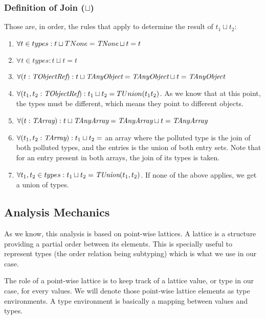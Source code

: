 \documentclass[a4paper]{article}
\begin{document}
\subsubsection{Definition of Join ($\sqcup$)}
Those are, in order, the rules that apply to determine the result of $t_1 \sqcup t_2$:
\begin{enumerate}
  \item $\forall t \in types : t \sqcup TNone = \emph{TNone} \sqcup t = t$
  \item $\forall t \in types : t \sqcup t = t$
  \item $\forall (t: \emph{TObjectRef}): t \sqcup \emph{TAnyObject} = \emph{TAnyObject} \sqcup t = \emph{TAnyObject}$
  \item $\forall (t_1,t_2: \emph{TObjectRef}): t_1 \sqcup t_2 = TUnion(t_1 t_2)$. As we
    know that at this point, the types must be different, which means they
    point to different objects.
  \item $\forall (t: \emph{TArray}): t \sqcup \emph{TAnyArray} = \emph{TAnyArray} \sqcup t = \emph{TAnyArray}$
  \item $\forall (t_1,t_2: \emph{TArray}): t_1 \sqcup t_2 = $ an array where the
    polluted type is the join of both polluted types, and the entries is the
    union of both entry sets. Note that for an entry present in both arrays,
    the join of its types is taken.

  \item $\forall t_1,t_2 \in types: t_1 \sqcup t_2 = \emph{TUnion}(t_1, t_2)$. If none of the above applies, we get a union of types.
\end{enumerate}

\subsection{Analysis Mechanics}
As we know, this analysis is based on point-wise lattices. A lattice is a
structure providing a partial order between its elements. This is specially
useful to represent types (the order relation being subtyping) which is what
we use in our case.

The role of a point-wise lattice is to keep track of a lattice value, or type in
our case, for every values. We will denote those point-wise lattice elements as
type environments. A type environment is basically a mapping between values and
types.
\end{document}
